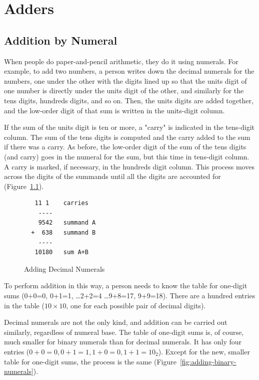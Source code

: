 \chapter{Adders}
\label{ch:adders}


\section{Addition by Numeral}
\label{sec:addition-by-numeral}

When people do paper-and-pencil arithmetic,
they do it using numerals.
For example, to add two numbers, a person
writes down the decimal numerals for the numbers,
one under the other with the digits lined up so that
the units digit of one number is directly under
the units digit of the other, and similarly for
the tens digits, hundreds digits, and so on.
Then, the units digits are added together,
and the low-order digit of that sum is written
in the units-digit column.

If the sum of the units digit is ten or more,
a "carry" is indicated in the tens-digit column.
The sum of the tens digits is computed and the
carry added to the sum if there was a carry.
As before, the low-order digit of the sum of the
tens digits (and carry) goes in the numeral for the sum,
but this time in tens-digit column.
A carry is marked, if necessary,
in the hundreds digit column.
This process moves across the digits of the summands until all the digits
are accounted for (Figure~\ref{fig:adding-decimal-numerals}).

\begin{figure}
\begin{Verbatim}
   11 1    carries
    ----
    9542   summand A
  +  638   summand B
    ----
   10180   sum A+B
\end{Verbatim}
\caption{Adding Decimal Numerals}
\label{fig:adding-decimal-numerals}
\end{figure}

To perform addition in this way, a person needs to know
the table for one-digit sums (0+0=0, 0+1=1, \dots 2+2=4 \dots 9+8=17, 9+9=18).
There are a hundred entries in the table ($10 \times 10$, one for each
possible pair of decimal digits).

Decimal numerals are not the only kind,
and addition can be carried out similarly, regardless of numeral base.
The table of one-digit sums is, of course, much smaller for binary numerals
than for decimal numerals.
It has only four entries ($0+0=0, 0+1=1, 1+0=0, 1+1=10_2$).
Except for the new, smaller table for one-digit sums,
the process is the same (Figure~\ref{fig:adding-binary-numerals}).

